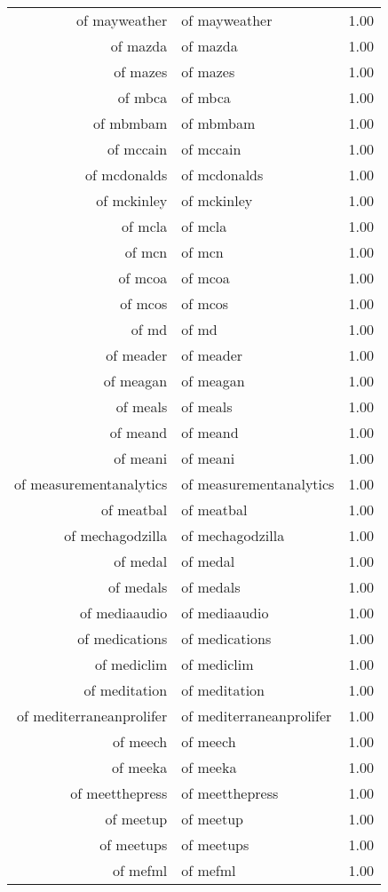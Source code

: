 \begin{table}[ht]
\begin{tabular}{rlr}
  of mayweather & of mayweather & 1.00 \\ 
  of mazda & of mazda & 1.00 \\ 
  of mazes & of mazes & 1.00 \\ 
  of mbca & of mbca & 1.00 \\ 
  of mbmbam & of mbmbam & 1.00 \\ 
  of mccain & of mccain & 1.00 \\ 
  of mcdonalds & of mcdonalds & 1.00 \\ 
  of mckinley & of mckinley & 1.00 \\ 
  of mcla & of mcla & 1.00 \\ 
  of mcn & of mcn & 1.00 \\ 
  of mcoa & of mcoa & 1.00 \\ 
  of mcos & of mcos & 1.00 \\ 
  of md & of md & 1.00 \\ 
  of meader & of meader & 1.00 \\ 
  of meagan & of meagan & 1.00 \\ 
  of meals & of meals & 1.00 \\ 
  of meand & of meand & 1.00 \\ 
  of meani & of meani & 1.00 \\ 
  of measurementanalytics & of measurementanalytics & 1.00 \\ 
  of meatbal & of meatbal & 1.00 \\ 
  of mechagodzilla & of mechagodzilla & 1.00 \\ 
  of medal & of medal & 1.00 \\ 
  of medals & of medals & 1.00 \\ 
  of mediaaudio & of mediaaudio & 1.00 \\ 
  of medications & of medications & 1.00 \\ 
  of mediclim & of mediclim & 1.00 \\ 
  of meditation & of meditation & 1.00 \\ 
  of mediterraneanprolifer & of mediterraneanprolifer & 1.00 \\ 
  of meech & of meech & 1.00 \\ 
  of meeka & of meeka & 1.00 \\ 
  of meetthepress & of meetthepress & 1.00 \\ 
  of meetup & of meetup & 1.00 \\ 
  of meetups & of meetups & 1.00 \\ 
  of mefml & of mefml & 1.00 \\ 

\end{tabular}
\end{table}
